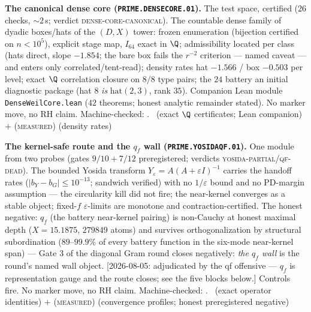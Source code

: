 \documentclass[11pt,a4paper]{article}
\theoremstyle{definition}
\begin{document}
\par\smallskip\noindent\textbf{The canonical dense core
(\texttt{PRIME.DENSECORE.01}).}
The test space, certified ($26$ checks, ${\sim}2$\,s; verdict
\textsc{dense-core-canonical}).  The countable dense family of
dyadic boxes/hats of the $(D,X)$ tower: frozen enumeration
(bijection certified on $n<10^5$), explicit stage map, $I_{64}$
exact in $\Q$; admissibility located per class (hats direct, slope
$-1.854$; the bare box fails the $r^{-2}$ criterion --- named
caveat --- and enters only correlated/tent-read); density rates hat
$-1.566$ / box $-0.503$ per level; exact $\Q$ correlation closure
on $8/8$ type pairs; the $24$ battery an initial diagnostic package
(hat 8 \emph{is} $\mathrm{hat}(2,3)$, rank $35$).  Companion Lean
module \texttt{DenseWeilCore.lean} ($42$ theorems; honest analytic
remainder stated).  No marker move, no RH claim.
Machine-checked: .
\mE\ (exact $\Q$ certificates; Lean companion) $+$
(\textsc{measured}) (density rates)
\par\smallskip

\par\smallskip\noindent\textbf{The kernel-safe route and the $q_f$
wall (\texttt{PRIME.YOSIDAQF.01}).}
One module from two probes (gates $9/10+7/12$ preregistered;
verdicts \textsc{yosida-partial}/\textsc{qf-dead}).  The bounded
Yosida transform $Y_\varepsilon=A(A+\varepsilon I)^{-1}$ carries
the handoff rates ($|b_Y-b_G|\le10^{-13}$; sandwich verified) with
no $1/\varepsilon$ bound and no PD-margin assumption --- the
circularity kill did not fire; the near-kernel converges as a
stable object; fixed-$f$ $\varepsilon$-limits are monotone and
contraction-certified.  The honest negative: $q_f$ (the battery
near-kernel pairing) is non-Cauchy at honest maximal depth
($X=15.1875$, $279849$ atoms) and survives orthogonalization by
structural subordination ($89$--$99.9\%$ of every battery function
in the six-mode near-kernel span) --- Gate 3 of the diagonal Gram
round closes negatively: \emph{the $q_f$ wall} is the round's
named wall object.  [2026-08-05: adjudicated by the qf offensive
--- $q_f$ is representation gauge and the route closes; see the
five blocks below.]  Controls fire.  No marker move, no RH claim.
Machine-checked: .
\mE\ (exact operator identities) $+$ (\textsc{measured})
(convergence profiles; honest preregistered negative)
\par\smallskip
\end{document}
